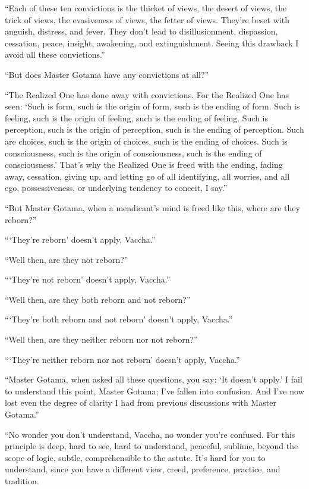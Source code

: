 \documentclass[12pt,openany]{book}%
\begin{document}
“Each of these ten convictions is the thicket of views, the desert of views, the trick of views, the evasiveness of views, the fetter of views. They’re beset with anguish, distress, and fever. They don’t lead to disillusionment, dispassion, cessation, peace, insight, awakening, and extinguishment. Seeing this drawback I avoid all these convictions.” 

“But does Master Gotama have any convictions at all?” 

“The Realized One has done away with convictions. For the Realized One has seen: ‘Such is form, such is the origin of form, such is the ending of form. Such is feeling, such is the origin of feeling, such is the ending of feeling. Such is perception, such is the origin of perception, such is the ending of perception. Such are choices, such is the origin of choices, such is the ending of choices. Such is consciousness, such is the origin of consciousness, such is the ending of consciousness.’ That’s why the Realized One is freed with the ending, fading away, cessation, giving up, and letting go of all identifying, all worries, and all ego, possessiveness, or underlying tendency to conceit, I say.” 

“But Master Gotama, when a mendicant’s mind is freed like this, where are they reborn?” 

“‘They’re reborn’ doesn’t apply, Vaccha.” 

“Well then, are they not reborn?” 

“‘They’re not reborn’ doesn’t apply, Vaccha.” 

“Well then, are they both reborn and not reborn?” 

“‘They’re both reborn and not reborn’ doesn’t apply, Vaccha.” 

“Well then, are they neither reborn nor not reborn?” 

“‘They’re neither reborn nor not reborn’ doesn’t apply, Vaccha.” 

“Master Gotama, when asked all these questions, you say: ‘It doesn’t apply.’ I fail to understand this point, Master Gotama; I’ve fallen into confusion. And I’ve now lost even the degree of clarity I had from previous discussions with Master Gotama.” 

“No wonder you don’t understand, Vaccha, no wonder you’re confused. For this principle is deep, hard to see, hard to understand, peaceful, sublime, beyond the scope of logic, subtle, comprehensible to the astute. It’s hard for you to understand, since you have a different view, creed, preference, practice, and tradition. 
\end{document}
